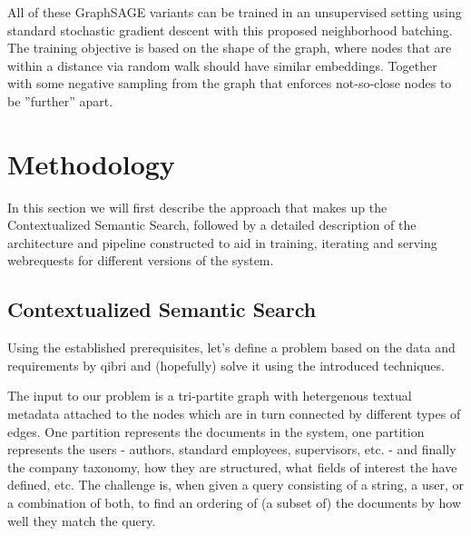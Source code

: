 \documentclass[draft,final]{vutinfth} %
\begin{document}
All of these GraphSAGE variants can be trained in an unsupervised setting using standard stochastic gradient descent with this proposed neighborhood batching. The training objective is based on the shape of the graph, where nodes that are within a distance via random walk should have similar embeddings. Together with some negative sampling from the graph that enforces not-so-close nodes to be ''further'' apart.






\chapter{Methodology} \label{chap:methodology}
In this section we will first describe the approach that makes up the Contextualized Semantic Search, followed by a detailed description of the architecture and pipeline constructed to aid in training, iterating and serving webrequests for different versions of the system.

\section{Contextualized Semantic Search}
Using the established prerequisites, let's define a problem based on the data and requirements by qibri and (hopefully) solve it using the introduced techniques.

The input to our problem is a tri-partite graph with hetergenous textual metadata attached to the nodes which are in turn connected by different types of edges. One partition represents the documents in the system, one partition represents the users - authors, standard employees, supervisors, etc. - and finally the company taxonomy, how they are structured, what fields of interest the have defined, etc. The challenge is, when given a query consisting of a string, a user, or a combination of both, to find an ordering of (a subset of) the documents by how well they match the query.
\end{document}

